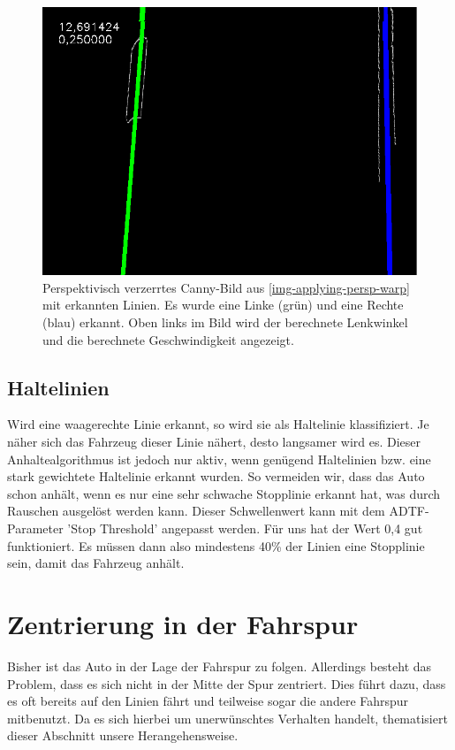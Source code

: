 \documentclass[a4paper,12pt]{report}
\begin{document}
	\begin{figure}
		\centering
		\includegraphics[width=.5\textwidth]{assets/Strasse-Final}
		\caption{Perspektivisch verzerrtes Canny-Bild aus \autoref{img-applying-persp-warp} mit erkannten Linien.
			Es wurde eine Linke (grün) und eine Rechte (blau) erkannt. Oben links im Bild wird der berechnete Lenkwinkel und die berechnete Geschwindigkeit angezeigt.}
		\label{img-lines}
	\end{figure}


\subsection{Haltelinien}

	Wird eine waagerechte Linie erkannt, so wird sie als Haltelinie klassifiziert.
	Je näher sich das Fahrzeug dieser Linie nähert, desto langsamer wird es.
	Dieser Anhaltealgorithmus ist jedoch nur aktiv, wenn genügend Haltelinien bzw. eine stark gewichtete Haltelinie erkannt wurden.
	So vermeiden wir, dass das Auto schon anhält, wenn es nur eine sehr schwache Stopplinie erkannt hat, was durch Rauschen ausgelöst werden kann.
	Dieser Schwellenwert kann mit dem ADTF-Parameter 'Stop Threshold' angepasst werden.
	Für uns hat der Wert 0,4 gut funktioniert.
	Es müssen dann also mindestens 40\% der Linien eine Stopplinie sein, damit das Fahrzeug anhält.

\section{Zentrierung in der Fahrspur}

	Bisher ist das Auto in der Lage der Fahrspur zu folgen.
	Allerdings besteht das Problem, dass es sich nicht in der Mitte der Spur zentriert.
	Dies führt dazu, dass es oft bereits auf den Linien fährt und teilweise sogar die andere Fahrspur mitbenutzt.
	Da es sich hierbei um unerwünschtes Verhalten handelt, thematisiert dieser Abschnitt unsere Herangehensweise.
\end{document}
